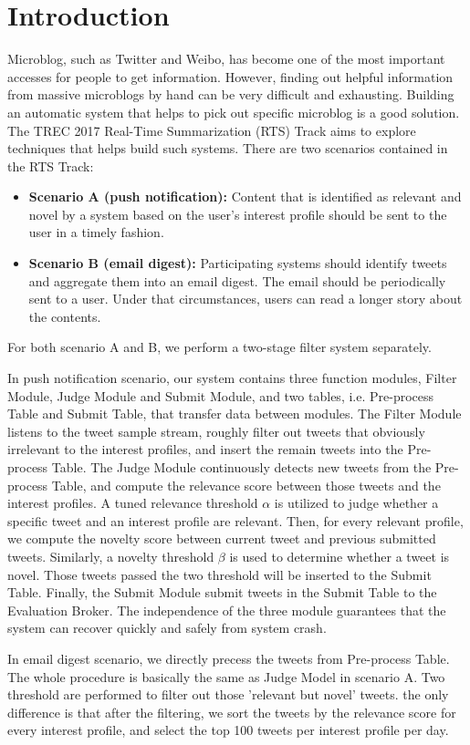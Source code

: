 \section{Introduction}
Microblog, such as Twitter and Weibo, has become one of the most important accesses for people to get information.
However, finding out helpful information from massive microblogs by hand can be very difficult and exhausting.
Building an automatic system that helps to pick out specific microblog is a good solution.
The TREC 2017 Real-Time Summarization (RTS) Track aims to explore techniques that helps build such systems.
There are two scenarios contained in the RTS Track: 

\begin{itemize}
\item \textbf{Scenario A (push notification):}
Content that is identified as relevant and novel by a system based
on the user's interest profile should be sent to the user in a timely fashion. 
\item \textbf{Scenario B (email digest):}
Participating systems should identify tweets and aggregate them into an email digest.
The email should be periodically sent to a user. Under that circumstances,
users can read a longer story about the contents.
\end{itemize}

For both scenario A and B, we perform a two-stage filter system separately.

In push notification scenario, our system contains three function modules, Filter Module, Judge Module and Submit Module, and two tables, i.e. Pre-process Table and Submit Table, that transfer data between modules. The Filter Module listens to the tweet sample stream, roughly filter out tweets that obviously     irrelevant to the interest profiles, and insert the remain tweets into the Pre-process Table. The Judge Module continuously detects new tweets from the Pre-process Table, and compute the relevance score between those tweets and the interest profiles. A tuned relevance threshold $\alpha$ is utilized to judge whether a specific tweet and an interest profile are relevant. Then, for every relevant profile, we compute   the novelty score between current tweet and previous submitted tweets. Similarly, a novelty threshold $\beta$ is used to determine whether a tweet is novel. Those tweets passed the two threshold will be inserted to the Submit Table. Finally, the Submit Module submit tweets in the Submit Table to the Evaluation Broker. The independence of the three module guarantees that the system can recover quickly and safely from system crash.

In email digest scenario, we directly precess the tweets from Pre-process Table. The whole procedure is basically the same as Judge Model in scenario A. Two threshold are performed to filter out those 'relevant but novel' tweets. the only difference is that after the filtering, we sort the tweets by the relevance score for every interest profile, and select the top 100 tweets per interest profile per day. 


